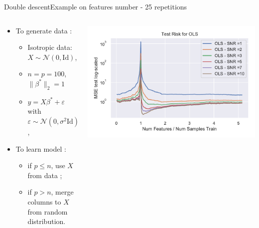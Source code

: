\documentclass[10pt,aspectratio=43]{beamer}
\begin{document}
\begin{frame}{Double descent}{Example on features number - 25 repetitions}
    \begin{columns}
        \begin{column}{0.46\textwidth}
            \begin{itemize}
                \item To generate data :
                \begin{itemize}
                    \item Isotropic data: $X\sim\mathcal{N}(0,\mathrm{Id})$,
                    \item $n=p=100$,
                    $\|\beta^*\|_2=1$
                    \item $y = X\beta^*+\varepsilon$ with $\varepsilon\sim \mathcal{N}(0, \sigma^2\mathrm{Id})$,
                \end{itemize}
                \item To learn model :
                \begin{itemize}
                    \item if $p\leq n$, use $X$ from data ;
                    \item if $p > n$, merge columns to $X$ from random distribution.
                \end{itemize}
            \end{itemize}
        \end{column}
        \begin{column}{0.7\textwidth}
            \begin{center}
             \includegraphics[width=1\textwidth]{ols_fail_log_snr_features.pdf}

\end{center}
\end{column}
\end{columns}
\end{frame}
\end{document}
